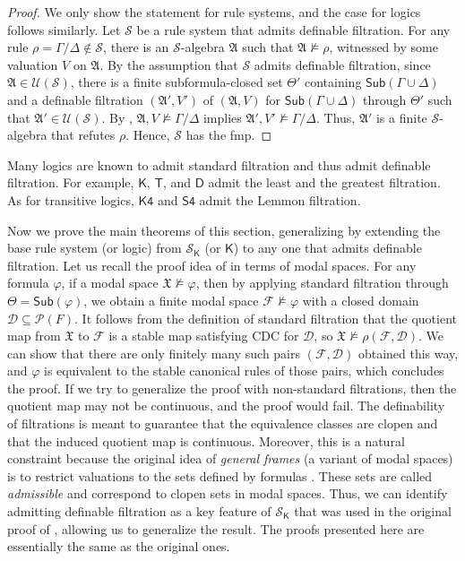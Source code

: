 \documentclass[a4paper,11pt]{article}
\theoremstyle{definition}
\theoremstyle{remark}
\numberwithin{theorem}{section}
\newcommand{\alg}[1]{\mathfrak{#1}}
\newcommand{\A}{\alg{A}}
\renewcommand{\sp}[1]{\mathfrak{#1}}
\newcommand{\X}{\sp{X}}
\newcommand{\fr}[1]{\mathcal{#1}}
\newcommand{\F}{\fr{F}}
\newcommand{\class}[1]{\mathcal{#1}}
\newcommand{\U}{\class{U}}
\newcommand{\D}{\class{D}}
\renewcommand{\S}{\class{S}}
\newcommand{\pow}[1]{\mathcal{P} (#1)}
\newcommand{\logic}[1]{\mathsf{#1}}
\newcommand{\K}{\logic{K}}
\newcommand{\Kf}{\logic{K4}}
\newcommand{\Sf}{\logic{S4}}
\newcommand{\Sub}{\mathsf{Sub}}
\renewcommand{\phi}{\varphi}
\renewcommand{\S}{\mathcal{S}}
\begin{document}
\begin{proof}
    We only show the statement for rule systems, and the case for logics follows similarly. Let $\S$ be a rule system that admits definable filtration. For any rule $\rho = \Gamma/\Delta \notin \S$, there is an $\S$-algebra $\A$ such that $\A \not\models \rho$, witnessed by some valuation $V$ on $\A$. By the assumption that $\S$ admits definable filtration, since $\A \in \U(\S)$, there is a finite subformula-closed set $\Theta'$ containing $\Sub(\Gamma \cup \Delta)$ and a definable filtration $(\A', V')$ of $(\A, V)$ for $\Sub(\Gamma \cup \Delta)$ through $\Theta'$ such that $\A' \in \U(\S)$. By , $\A, V \not \models \Gamma/\Delta$ implies $\A', V' \not \models \Gamma/\Delta$. Thus, $\A'$ is a finite $\S$-algebra that refutes $\rho$. Hence, $\S$ has the fmp. 
\end{proof}

Many logics are known to admit standard filtration and thus admit definable filtration. For example, $\K$, $\logic{T}$, and $\logic{D}$ admit the least and the greatest filtration. As for transitive logics, $\Kf$ and $\Sf$ admit the Lemmon filtration.



Now we prove the main theorems of this section, generalizing  by extending the base rule system (or logic) from $\S_\K$ (or $\K$) to any one that admits definable filtration. Let us recall the proof idea of  in terms of modal spaces. For any formula $\phi$, if a modal space $\X \not\models \phi$, then by applying standard filtration through $\Theta = \Sub(\phi)$, we obtain a finite modal space $\F \not\models \phi$ with a closed domain $\D \subseteq\pow{F}$. It follows from the definition of standard filtration that the quotient map from $\X$ to $\F$ is a stable map satisfying CDC for $\D$, so $\X \not\models \rho(\F, \D)$. We can show that there are only finitely many such pairs $(\F, \D)$ obtained this way, and $\phi$ is equivalent to the stable canonical rules of those pairs, which concludes the proof. If we try to generalize the proof with non-standard filtrations, then the quotient map may not be continuous, and the proof would fail. The definability of filtrations is meant to guarantee that the equivalence classes are clopen and that the induced quotient map is continuous. Moreover, this is a natural constraint because the original idea of \emph{general frames} (a variant of modal spaces) is to restrict valuations to the sets defined by formulas \cite[Section 8.1]{czModalLogic1997}. These sets are called \emph{admissible} and correspond to clopen sets in modal spaces. Thus, we can identify admitting definable filtration as a key feature of $\S_\K$ that was used in the original proof of , allowing us to generalize the result. The proofs presented here are essentially the same as the original ones.
\end{document}
